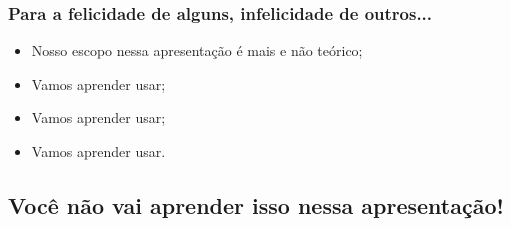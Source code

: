 \begin{frame}
	\Large{}
\end{frame}

\begin{frame}
	\frametitle{Para a felicidade de alguns, infelicidade de outros...}
	
	\begin{itemize}
		\item Nosso escopo nessa apresentação é mais  e não teórico;
		\item Vamos aprender  usar;
		\item Vamos aprender  usar;
		\item Vamos aprender  usar.
	\end{itemize}
\end{frame}

\subsection{Você não vai aprender isso nessa apresentação!}

